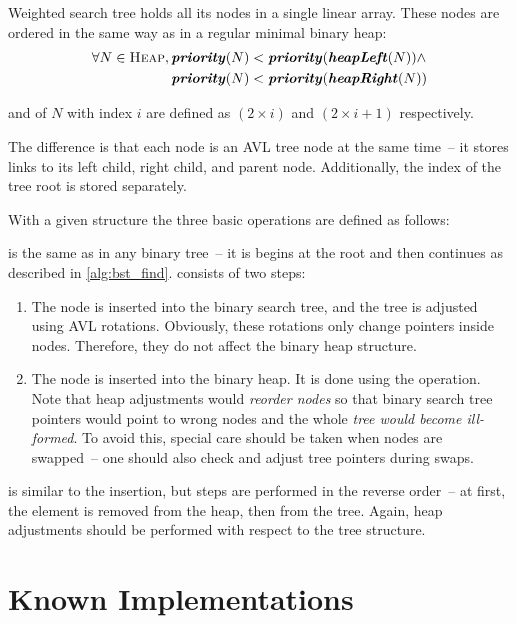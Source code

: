 Weighted search tree holds all its nodes in a single linear array. These nodes are ordered in the same way as in a regular minimal binary heap:
\begin{equation}
\begin{aligned}
  \forall N \in \textsc{Heap},{}
     & \textbf{\textit{priority}}(N) < \textbf{\textit{priority}}(\textbf{\textit{heapLeft}}(N)) {} \land \\
     & \textbf{\textit{priority}}(N) < \textbf{\textit{priority}}(\textbf{\textit{heapRight}}(N))
\end{aligned}
\end{equation}

 and  of $N$ with index $i$ are defined as $(2 \times i)$ and $(2 \times i + 1)$ respectively.


The difference is that each node is an AVL tree node at the same time~-- it stores links to its left child, right child, and parent node. Additionally, the index of the tree root is stored separately.

With a given structure the three basic operations are defined as follows:
\begin{block-description}
\blockitem[\findop] is the same as in any binary tree~-- it is begins at the root and then continues as described in \cref{alg:bst_find}.
\blockitem[\insertop] consists of two steps:
  \begin{enumerate}
  \item The node is inserted into the binary search tree, and the tree is adjusted using AVL rotations. Obviously, these rotations only change pointers inside nodes. Therefore, they do not affect the binary heap structure.
  \item The node is inserted into the binary heap. It is done using the  operation\cite{sedgewick}. Note that heap adjustments would \emph{reorder nodes} so that binary search tree pointers would point to wrong nodes and the whole \emph{tree would become ill-formed}. To avoid this, special care should be taken when nodes are swapped~-- one should also check and adjust tree pointers during swaps.
  \end{enumerate}
\blockitem[\removeop] is similar to the insertion, but steps are performed in the reverse order~-- at first, the element is removed from the heap, then from the tree. Again, heap adjustments should be performed with respect to the tree structure.
\end{block-description}

\section{Known Implementations}

